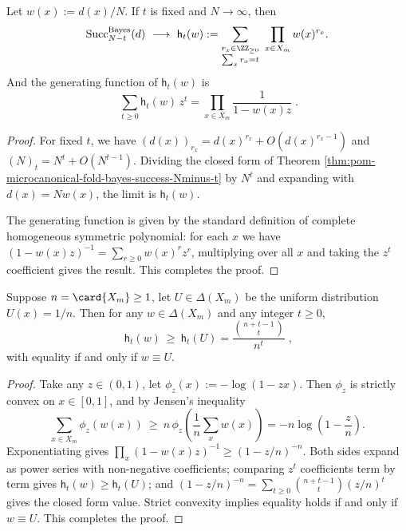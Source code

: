 



\begin{theorem}\label{thm:pom-microcanonical-fold-bayes-success-thermo-limit}
Let \(w(x):=d(x)/N\).
If \(t\) is fixed and \(N\to\infty\), then
\[
\mathrm{Succ}^{\mathrm{Bayes}}_{N-t}(d)\ \longrightarrow\ \mathsf{h}_t(w)
:=\sum_{\substack{r_x\in\ZZ_{\ge 0}\\ \sum_x r_x=t}}\ \prod_{x\in X_m} w(x)^{r_x}.
\]
And the generating function of \(\mathsf{h}_t(w)\) is
\[
\boxed{\;
\sum_{t\ge 0}\mathsf{h}_t(w)\,z^t=\prod_{x\in X_m}\frac{1}{1-w(x)z}\; } .
\]
\end{theorem}
\begin{proof}
For fixed \(t\), we have
\(
(d(x))_{r_x}=d(x)^{r_x}+O(d(x)^{r_x-1})
\)
and \((N)_t=N^t+O(N^{t-1})\).
Dividing the closed form of Theorem \ref{thm:pom-microcanonical-fold-bayes-success-Nminus-t} by \(N^t\) and expanding with \(d(x)=Nw(x)\),
the limit is \(\mathsf{h}_t(w)\).
\par
The generating function is given by the standard definition of complete homogeneous symmetric polynomial:
for each \(x\) we have \((1-w(x)z)^{-1}=\sum_{r\ge 0}w(x)^r z^r\), multiplying over all \(x\) and taking the \(z^t\) coefficient gives the result. This completes the proof.
\end{proof}

\begin{theorem}\label{thm:pom-microcanonical-fold-ht-uniform-min}
Suppose \(n=\card{X_m}\ge 1\), let \(U\in\Delta(X_m)\) be the uniform distribution \(U(x)=1/n\).
Then for any \(w\in\Delta(X_m)\) and any integer \(t\ge 0\),
\[
\boxed{\;
\mathsf{h}_t(w)\ \ge\ \mathsf{h}_t(U)=\frac{\binom{n+t-1}{t}}{n^t}\; } ,
\]
with equality if and only if \(w\equiv U\).
\end{theorem}
\begin{proof}
Take any \(z\in(0,1)\), let \(\phi_z(x):=-\log(1-zx)\).
Then \(\phi_z\) is strictly convex on \(x\in[0,1]\), and by Jensen's inequality
\[
\sum_{x\in X_m}\phi_z(w(x))
\ \ge\
n\,\phi_z\!\left(\frac{1}{n}\sum_x w(x)\right)
= -n\log\!\left(1-\frac{z}{n}\right).
\]
Exponentiating gives
\(
\prod_x(1-w(x)z)^{-1}\ge (1-z/n)^{-n}
\).
Both sides expand as power series with non-negative coefficients; comparing \(z^t\) coefficients term by term gives \(\mathsf{h}_t(w)\ge \mathsf{h}_t(U)\);
and
\(
(1-z/n)^{-n}=\sum_{t\ge 0}\binom{n+t-1}{t}(z/n)^t
\)
gives the closed form value.
Strict convexity implies equality holds if and only if \(w\equiv U\). This completes the proof.
\end{proof}

